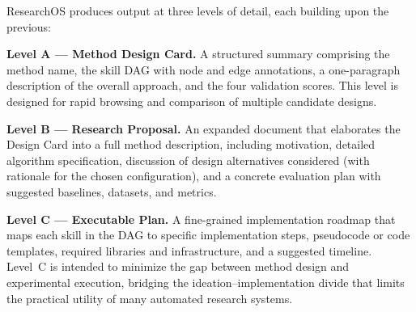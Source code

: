 ResearchOS produces output at three levels of detail, each building upon the previous:

\textbf{Level A --- Method Design Card.} A structured summary comprising the method name, the skill DAG with node and edge annotations, a one-paragraph description of the overall approach, and the four validation scores. This level is designed for rapid browsing and comparison of multiple candidate designs.

\textbf{Level B --- Research Proposal.} An expanded document that elaborates the Design Card into a full method description, including motivation, detailed algorithm specification, discussion of design alternatives considered (with rationale for the chosen configuration), and a concrete evaluation plan with suggested baselines, datasets, and metrics.

\textbf{Level C --- Executable Plan.} A fine-grained implementation roadmap that maps each skill in the DAG to specific implementation steps, pseudocode or code templates, required libraries and infrastructure, and a suggested timeline. Level~C is intended to minimize the gap between method design and experimental execution, bridging the ideation--implementation divide that limits the practical utility of many automated research systems.
